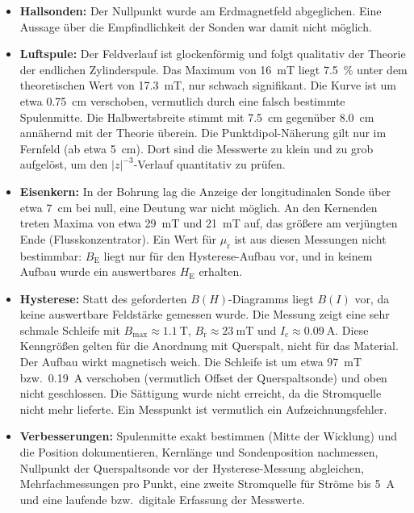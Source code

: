 \documentclass[a4paper,11pt]{article}
\begin{document}
\begin{itemize}
  \item \textbf{Hallsonden:} Der Nullpunkt wurde am Erdmagnetfeld abgeglichen. Eine
        Aussage über die Empfindlichkeit der Sonden war damit nicht möglich.
  \item \textbf{Luftspule:} Der Feldverlauf ist glockenförmig und folgt
        qualitativ der Theorie der endlichen Zylinderspule. Das Maximum von
        \SI{16}{\milli\tesla} liegt \SI{7.5}{\percent} unter dem theoretischen
        Wert von \SI{17.3}{\milli\tesla}, nur schwach signifikant. Die Kurve ist
        um etwa \SI{0.75}{\centi\meter} verschoben, vermutlich durch eine falsch
        bestimmte Spulenmitte. Die Halbwertsbreite stimmt mit \SI{7.5}{\centi\meter}
        gegenüber \SI{8.0}{\centi\meter} annähernd mit der Theorie überein.
        Die Punktdipol-Näherung gilt nur im Fernfeld (ab etwa \SI{5}{\centi\meter}). Dort
        sind die Messwerte zu klein und zu grob aufgelöst, um den $|z|^{-3}$-Verlauf
        quantitativ zu prüfen.
  \item \textbf{Eisenkern:} In der Bohrung lag die Anzeige der longitudinalen
        Sonde über etwa \SI{7}{\centi\meter} bei null, eine Deutung war nicht
        möglich. An den Kernenden treten Maxima von etwa \SI{29}{\milli\tesla}
        und \SI{21}{\milli\tesla} auf, das größere am verjüngten Ende
        (Flusskonzentrator). Ein Wert für $\mu_\mathrm{r}$ ist aus diesen
        Messungen nicht bestimmbar: $B_\mathrm{E}$ liegt nur für den
        Hysterese-Aufbau vor, und in keinem Aufbau wurde ein auswertbares
        $H_\mathrm{E}$ erhalten.
  \item \textbf{Hysterese:} Statt des geforderten $B(H)$-Diagramms liegt $B(I)$
        vor, da keine auswertbare Feldstärke gemessen wurde. Die Messung zeigt
        eine sehr schmale Schleife mit $B_\mathrm{max}\approx\SI{1.1}{\tesla}$,
        $B_\mathrm{r}\approx\SI{23}{\milli\tesla}$ und
        $I_\mathrm{c}\approx\SI{0.09}{\ampere}$. Diese Kenngrößen gelten für die
        Anordnung mit Querspalt, nicht für das Material. Der Aufbau wirkt
        magnetisch weich. Die Schleife ist um etwa \SI{97}{\milli\tesla} bzw.\
        \SI{0.19}{\ampere} verschoben (vermutlich Offset der Querspaltsonde) und
        oben nicht geschlossen. Die Sättigung wurde nicht erreicht, da die
        Stromquelle nicht mehr lieferte. Ein Messpunkt ist vermutlich ein
        Aufzeichnungsfehler.
  \item \textbf{Verbesserungen:} Spulenmitte exakt bestimmen (Mitte der Wicklung)
        und die Position dokumentieren, Kernlänge und Sondenposition
        nachmessen, Nullpunkt der Querspaltsonde vor der Hysterese-Messung
        abgleichen, Mehrfachmessungen pro Punkt, eine zweite Stromquelle für
        Ströme bis \SI{5}{\ampere} und eine laufende bzw.\ digitale Erfassung der
        Messwerte.
\end{itemize}
\end{document}
